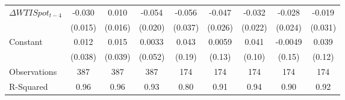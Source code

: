 {\begin{tabular}{l*{8}{c}}
$\Delta WTISpot_{t-4}$&      -0.030\sym{*}  &       0.010         &      -0.054\sym{***}&      -0.056         &      -0.047\sym{*}  &      -0.032         &      -0.028         &      -0.019         \\
                    &     (0.015)         &     (0.016)         &     (0.020)         &     (0.037)         &     (0.026)         &     (0.022)         &     (0.024)         &     (0.031)         \\
Constant            &       0.012         &       0.015         &      0.0033         &       0.043         &      0.0059         &       0.041         &     -0.0049         &       0.039         \\
                    &     (0.038)         &     (0.039)         &     (0.052)         &      (0.19)         &      (0.13)         &      (0.10)         &      (0.15)         &      (0.12)         \\
\midrule
Observations        &         387         &         387         &         387         &         174         &         174         &         174         &         174         &         174         \\
R-Squared           &        0.96         &        0.96         &        0.93         &        0.80         &        0.91         &        0.94         &        0.90         &        0.92         \\
\bottomrule
\end{tabular}
}
